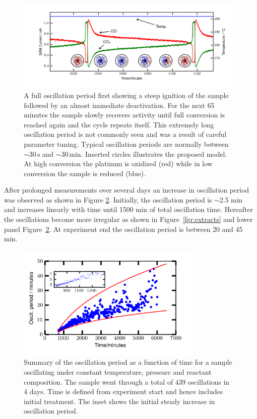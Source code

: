 \documentclass[8.5pt,twoside,twocolumn]{article}
\begin{document}
\begin{figure}
  \centering
  \includegraphics[width=17cm]{single_full_oscillation.png}
  \caption{A full oscillation period first showing a steep ignition of the
  sample followed by an almost immediate deactivation. For the next 65 minutes
  the sample slowly recovers activity until full conversion is reached again
  and the cycle repeats itself. This extremely long oscillation period is not
  commonly seen and was a result of careful parameter tuning. Typical
  oscillation periods are normally between $\sim$30\,s and $\sim$30\,min.
  Inserted circles illustrates the proposed model. At high conversion the
  platinum is oxidized (red) while in low conversion the sample is reduced
  (blue).}
  \label{fgr:full_oscillation}
\end{figure}

After prolonged measurements over several days an increase in oscillation
period was observed as shown in Figure \ref{fgr:long_measurement}. Initially,
the oscillation period is $\sim$2.5 min and increases linearly with time until
1500 min of total oscillation time. Hereafter the oscillations become more
irregular as shown in Figure~\ref{fgr:extracts} and lower panel
Figure~\ref{fgr:long_measurement}. At experiment end the oscillation period is
between 20 and 45 min.

\begin{figure}[h]
\centering
  \includegraphics[width=9cm]{summary_of_long_measurement.png}
  \caption{Summary of the oscillation period as a function of time for a sample
  oscillating under constant temperature, pressure and reactant composition.
  The sample went through a total of 439 oscillations in 4 days. Time is
  defined from experiment start and hence includes initial treatment. The inset
  shows the initial steady increase in oscillation period.}
  \label{fgr:long_measurement}
\end{figure}
  
\end{document}
